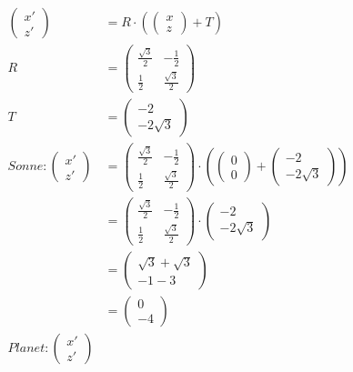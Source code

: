 \documentclass[a4paper,10pt,DIV=14]{scrartcl}
\begin{document}
\begin{align*}
 \begin{pmatrix} x' \\ z' \end{pmatrix} &= R \cdot \left(\begin{pmatrix} x \\ z \end{pmatrix} + T\right) \\
R &= 
\begin{pmatrix} 
\frac{\sqrt{3}}{2} & -\frac{1}{2} \\
\frac{1}{2} & \frac{\sqrt{3}}{2}
\end{pmatrix} \\
T &= \begin{pmatrix}
-2 \\ -2\sqrt{3}
\end{pmatrix} \\
Sonne: \begin{pmatrix} x' \\ z' \end{pmatrix} 
&= 
\begin{pmatrix} 
\frac{\sqrt{3}}{2} & -\frac{1}{2} \\
\frac{1}{2} & \frac{\sqrt{3}}{2}
\end{pmatrix} 
\cdot 
\left(
\begin{pmatrix}
0 \\ 0 
\end{pmatrix} + 
\begin{pmatrix}
-2 \\ -2\sqrt{3}
\end{pmatrix}\right) \\
&= 
\begin{pmatrix} 
\frac{\sqrt{3}}{2} & -\frac{1}{2} \\
\frac{1}{2} & \frac{\sqrt{3}}{2}
\end{pmatrix} 
\cdot 
\begin{pmatrix}
-2 \\ -2\sqrt{3}
\end{pmatrix} \\
&= 
\begin{pmatrix}
\sqrt{3} + \sqrt{3} \\
-1 - 3
\end{pmatrix} \\
&= 
\begin{pmatrix}
0 \\ -4
\end{pmatrix} \\
Planet: \begin{pmatrix} x' \\ z' \end{pmatrix} 

\end{align*}
\end{document}
